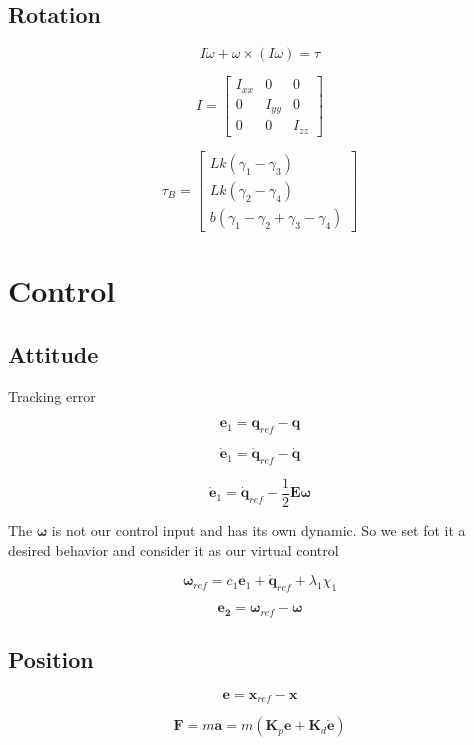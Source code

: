 \documentclass{article}
\begin{document}

\subsection{Rotation}

\[
I \dot{\omega} + \omega \times \left( I \omega \right) = \tau
\]

\[
I =
\begin{bmatrix}
I_{xx} & 0 & 0 \\
0 & I_{yy} & 0 \\
0 & 0 & I_{zz}
\end{bmatrix}
\]

\[
\tau_B =
\begin{bmatrix}
Lk \left( \gamma_1 - \gamma_3 \right) \\
Lk \left( \gamma_2 - \gamma_4 \right) \\
b \left( \gamma_1 - \gamma_2 + \gamma_3 - \gamma_4 \right)
\end{bmatrix}
\]

\section{Control}

\subsection{Attitude}
Tracking error

\[
\mathbf{e}_1 = \mathbf{q}_{ref} - \mathbf{q}
\]

\[
\dot{\mathbf{e}}_1 = \dot{\mathbf{q}}_{ref} - \dot{\mathbf{q}}
\]

\[
\dot{\mathbf{e}}_1 = \dot{\mathbf{q}}_{ref} - \frac{1}{2} \mathbf{E} \boldsymbol\omega
\]

The $\boldsymbol\omega$ is not our control input and has its own dynamic. So we set fot it a desired behavior and consider it as our virtual control

\[
\boldsymbol\omega_{ref} = c_1 \mathbf{e}_1 + \dot{\mathbf{q}}_{ref} + \lambda_1 \chi_1
\]

\[
\mathbf{e_2} = \boldsymbol\omega_{ref} - \boldsymbol\omega
\]

\subsection{Position}



\[
\mathbf{e} = \mathbf{x}_{ref} - \mathbf{x}
\]

\[
\mathbf{F} =
m \mathbf{a} =
m \left( \mathbf{K}_p \mathbf{e} + \mathbf{K}_d \dot{\mathbf{e}} \right)
\]
\end{document}
